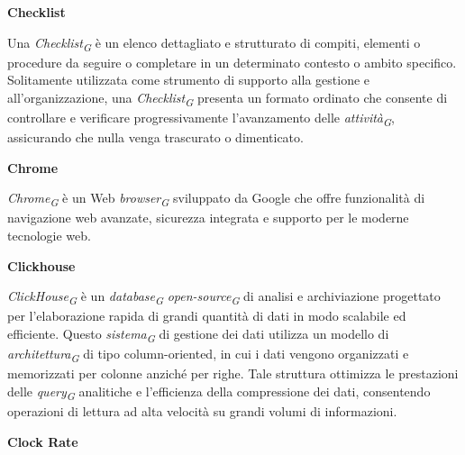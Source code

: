 \documentclass{article}
\begin{document}
\vspace{0.4cm}

\textbf{Checklist}

\vspace{0.1cm}

Una \textit{Checklist}\textsubscript{\textit{G}} è un elenco dettagliato e strutturato di compiti, elementi o procedure da seguire o completare in un determinato contesto o ambito specifico. Solitamente utilizzata come strumento di supporto alla gestione e all'organizzazione, una \textit{Checklist}\textsubscript{\textit{G}} presenta un formato ordinato che consente di controllare e verificare progressivamente l'avanzamento delle \textit{attività}\textsubscript{\textit{G}}, assicurando che nulla venga trascurato o dimenticato.

\vspace{0.4cm}

\textbf{Chrome}

\vspace{0.1cm}

\textit{Chrome}\textsubscript{\textit{G}} è un Web \textit{browser}\textsubscript{\textit{G}} sviluppato da Google che offre funzionalità di navigazione web avanzate, sicurezza integrata e supporto per le moderne tecnologie web.

\vspace{0.4cm}

\textbf{Clickhouse}

\vspace{0.1cm}

\textit{ClickHouse}\textsubscript{\textit{G}} è un \textit{database}\textsubscript{\textit{G}} \textit{open-source}\textsubscript{\textit{G}} di analisi e archiviazione progettato per l'elaborazione rapida di grandi quantità di dati in modo scalabile ed efficiente. Questo \textit{sistema}\textsubscript{\textit{G}} di gestione dei dati utilizza un modello di \textit{architettura}\textsubscript{\textit{G}} di tipo column-oriented, in cui i dati vengono organizzati e memorizzati per colonne anziché per righe. Tale struttura ottimizza le prestazioni delle \textit{query}\textsubscript{\textit{G}} analitiche e l'efficienza della compressione dei dati, consentendo operazioni di lettura ad alta velocità su grandi volumi di informazioni. 

\vspace{0.4cm}

\textbf{Clock Rate}

\vspace{0.1cm}
\end{document}
